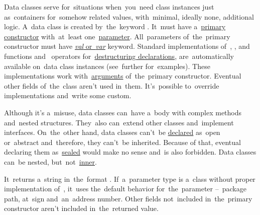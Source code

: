 \label{kotlindataclass}
Data classes serve for~situations when~you~need class instances just as~containers for~somehow related values, with~minimal, ideally none, additional logic.
A~data class is created by~the~keyword .
It~must have a~\hyperref[kotlinprimaryconstructor]{primary constructor} with~at~least one~\hyperref[parameterargument]{parameter}.
All~parameters of~the~primary constructor must have \hyperref[kotlinvalvar]{\textit{val} \mbox{or \textit{var}}} keyword.
Standard implementations \mbox{of }, ,  \mbox{and } functions \mbox{and } operators for~\hyperref[kotlindestdecl]{destructuring declarations}, are~automatically available on~data class instances (see~further for~examples).
These implementations work with~\hyperref[parameterargument]{arguments} of~the~primary constructor.
Eventual other fields of~the~class aren't used in~them.
It's~possible to~override implementations and~write some custom.

Although it's a~misuse, data classes can~have a~body with complex methods and~nested structures.
They~also can~extend other classes and~implement interfaces.
On~the~other hand, data classes can't~be \hyperref[declarationdefinition]{declared} as~open or~abstract and~therefore, they can't~be inherited.
Because of that, eventual declaring them as~\hyperref[kotlinsealedclass]{sealed} would make no sense and~is also forbidden.
Data classes can~be nested, but~not~\hyperref[kotlininnerclass]{inner}.

\label{kotlindataclasstostring}
It~returns a~string in~the~format .
If~a~parameter type is a~class without proper implementation \mbox{of }, it~uses the~default behavior for~the~parameter --~package path, at~sign and~an~address number.
Other fields not~included in~the~primary constructor aren't included in~the~returned value.

